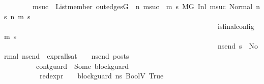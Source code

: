 \begin{isabellebody}
\ \ \ \ \ \ \ \ {\isacharparenleft}{\kern0pt}{\isasymforall}msuc{}{\isachardot}{\kern0pt}\ \ List{\isachardot}{\kern0pt}member\ {\isacharparenleft}{\kern0pt}out{\isacharunderscore}{\kern0pt}edges{\isacharparenleft}{\kern0pt}G{\isacharparenright}{\kern0pt}\ {\isacharbang}{\kern0pt}\ n{\isacharparenright}{\kern0pt}\ msuc{}\ {\isasymlongrightarrow}\ {\isacharparenleft}{\kern0pt}{\isasymforall}m{\isacharprime}{\kern0pt}\ s{\isacharprime}{\kern0pt}{\isachardot}{\kern0pt}\ {\isacharparenleft}{\kern0pt}{\isacharparenleft}{\kern0pt}M{\isacharcomma}{\kern0pt}{\isasymLambda}{\isacharcomma}{\kern0pt}{\isasymGamma}{\isacharcomma}{\kern0pt}{\isasymOmega}{\isacharcomma}{\kern0pt}G\ {\isasymturnstile}{\isacharparenleft}{\kern0pt}Inl\ {\isacharparenleft}{\kern0pt}msuc{}{\isacharparenright}{\kern0pt}{\isacharcomma}{\kern0pt}\ Normal\ ns{}{\isacharprime}{\kern0pt}{\isacharprime}{\kern0pt}{\isacharparenright}{\kern0pt}\ {\isacharminus}{\kern0pt}n{\isasymrightarrow}{\isacharasterisk}{\kern0pt}\ {\isacharparenleft}{\kern0pt}m{\isacharprime}{\kern0pt}{\isacharcomma}{\kern0pt}\ s{\isacharprime}{\kern0pt}{\isacharparenright}{\kern0pt}{\isacharparenright}{\kern0pt}\ {\isasymlongrightarrow}\isanewline
\ \ \ \ \ \ \ \ \ \ \ \ \ \ \ \ \ \ \ \ \ \ \ \ \ \ \ \ \ \ \ \ \ \ \ \ \ \ \ \ \ \ \ \ \ \ \ \ \ \ \ \ \ \ \ \ \ \ \ \ is{\isacharunderscore}{\kern0pt}final{\isacharunderscore}{\kern0pt}config\ {\isacharparenleft}{\kern0pt}m{\isacharprime}{\kern0pt}{\isacharcomma}{\kern0pt}\ s{\isacharprime}{\kern0pt}{\isacharparenright}{\kern0pt}\ {\isasymlongrightarrow}\ \isanewline
\ \ \ \ \ \ \ \ \ \ \ \ \ \ \ \ \ \ \ \ \ \ \ \ \ \ \ \ \ \ \ \ \ \ \ \ \ \ \ \ \ \ \ \ \ \ \ \ \ \ \ \ \ \ \ \ \ \ \ \ {\isacharparenleft}{\kern0pt}{\isasymforall}ns{\isacharunderscore}{\kern0pt}end{\isachardot}{\kern0pt}\ s{\isacharprime}{\kern0pt}\ {\isacharequal}{\kern0pt}\ Normal\ ns{\isacharunderscore}{\kern0pt}end\ {\isasymlongrightarrow}\ {\isacharparenleft}{\kern0pt}expr{\isacharunderscore}{\kern0pt}all{\isacharunderscore}{\kern0pt}sat\ {\isasymLambda}\ {\isasymGamma}\ {\isasymOmega}\ ns{\isacharunderscore}{\kern0pt}end{\isacharparenright}{\kern0pt}\ posts{\isacharparenright}{\kern0pt}{\isacharparenright}{\kern0pt}{\isacharparenright}{\kern0pt}{\isacharparenright}{\kern0pt}\ {\isasymLongrightarrow}\isanewline
\ \ \ \ \ \ \ \ {\isacharparenleft}{\kern0pt}\ {\isacharparenleft}{\kern0pt}cont{\isacharunderscore}{\kern0pt}guard\ {\isacharequal}{\kern0pt}\ Some\ block{\isacharunderscore}{\kern0pt}guard{\isacharparenright}{\kern0pt}\ {\isasymand}\ \isanewline
\ \ \ \ \ \ \ \ \ \ {\isacharparenleft}{\kern0pt}red{\isacharunderscore}{\kern0pt}expr\ {\isasymLambda}\ {\isasymGamma}\ {\isasymOmega}\ block{\isacharunderscore}{\kern0pt}guard\ ns{}{\isacharprime}{\kern0pt}{\isacharprime}{\kern0pt}\ {\isacharparenleft}{\kern0pt}BoolV\ True{\isacharparenright}{\kern0pt}{\isacharparenright}{\kern0pt}\ {\isasymand}\ \isanewline

\end{isabellebody}
